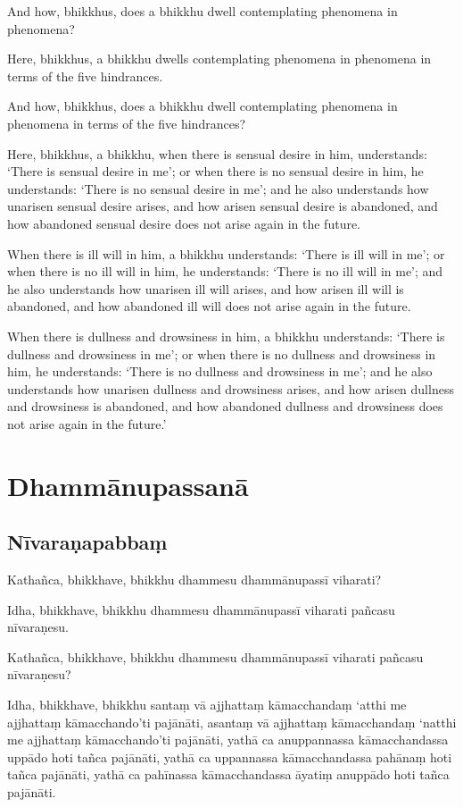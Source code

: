 And how, bhikkhus, does a bhikkhu dwell contemplating phenomena in phenomena?

Here, bhikkhus, a bhikkhu dwells contemplating phenomena in phenomena in terms
of the five hindrances.

And how, bhikkhus, does a bhikkhu dwell contemplating phenomena in phenomena in
terms of the five hindrances?

Here, bhikkhus, a bhikkhu,
when there is sensual desire in him, understands:
`There is sensual desire in me';
or when there is no sensual desire in him, he understands:
`There is no sensual desire in me';
and he also understands how unarisen sensual desire arises,
and how arisen sensual desire is abandoned,
and how abandoned sensual desire does not arise again in the future.

When there is ill will in him, a bhikkhu understands:
`There is ill will in me';
or when there is no ill will in him, he understands:
`There is no ill will in me';
and he also understands how unarisen ill will arises,
and how arisen ill will is abandoned,
and how abandoned ill will does not arise again in the future.

When there is dullness and drowsiness in him, a bhikkhu understands:
`There is dullness and drowsiness in me';
or when there is no dullness and drowsiness in him, he understands:
`There is no dullness and drowsiness in me';
and he also understands how unarisen dullness and drowsiness arises,
and how arisen dullness and drowsiness is abandoned, and
how abandoned dullness and drowsiness does not arise again in the future.'

\paliPage
\chapter*{Dhammānupassanā}

\section*{Nīvaraṇapabbaṃ}

Kathañca, bhikkhave, bhikkhu dhammesu dhammānupassī viharati?

Idha, bhikkhave, bhikkhu dhammesu dhammānupassī viharati pañcasu nīvaraṇesu.

Kathañca, bhikkhave, bhikkhu dhammesu dhammānupassī viharati pañcasu nīvaraṇesu?

Idha, bhikkhave, bhikkhu
santaṃ vā ajjhattaṃ kāmacchandaṃ ‘atthi me ajjhattaṃ kāmacchando’ti pajānāti,
asantaṃ vā ajjhattaṃ kāmacchandaṃ ‘natthi me ajjhattaṃ kāmacchando’ti pajānāti,
yathā ca anuppannassa kāmacchandassa uppādo hoti tañca pajānāti,
yathā ca uppannassa kāmacchandassa pahānaṃ hoti tañca pajānāti,
yathā ca pahīnassa kāmacchandassa āyatiṃ anuppādo hoti tañca pajānāti.

